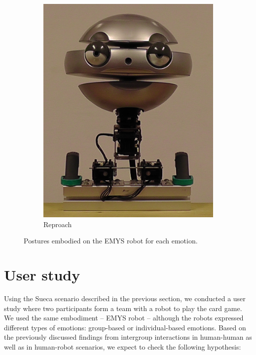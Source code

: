 \begin{figure}[ht]
\begin{subfigure}{0.2\columnwidth}
        \includegraphics[width=\columnwidth]{images/gbe/reproach.jpg}
        \caption{Reproach}
    \end{subfigure}
    \caption{Postures embodied on the EMYS robot for each emotion.}
    \label{fig:postures}
\end{figure}


\section{User study}
\label{sec:study4}
Using the Sueca scenario described in the previous section, we conducted a user study where two participants form a team with a robot to play the card game. We used the same embodiment -- EMYS robot -- although the robots expressed different types of emotions: group-based or individual-based emotions. Based on the previously discussed findings from intergroup interactions in human-human \cite{kessler2005group,allen2004exploring} as well as in human-robot \cite{kuchenbrandt2013robot,haring2014would,desai2012effects,wang2016trust} scenarios, we expect to check the following hypothesis:

